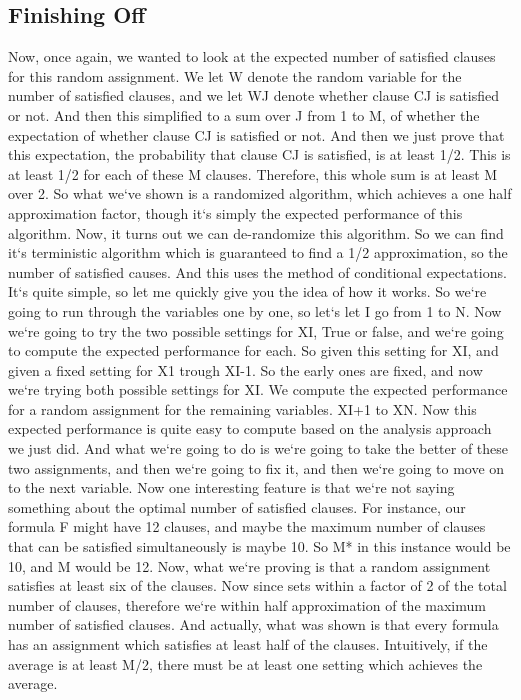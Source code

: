 \subsection{Finishing Off}
Now, once again, we wanted to look at the expected number of satisfied clauses for this random assignment.
We let W denote the random variable for the number of satisfied clauses, and we let WJ denote whether clause CJ is satisfied or not.
And then this simplified to a sum over J from 1 to M, of whether the expectation of whether clause CJ is satisfied or not.
And then we just prove that this expectation, the probability that clause CJ is satisfied, is at least 1/2.
This is at least 1/2 for each of these M clauses.
Therefore, this whole sum is at least M over 2.
So what we`ve shown is a randomized algorithm, which achieves a one half approximation factor, though it`s simply the expected performance of this algorithm.
Now, it turns out we can de-randomize this algorithm.
So we can find it`s terministic algorithm which is guaranteed to find a 1/2 approximation, so the number of satisfied causes.
And this uses the method of conditional expectations.
It`s quite simple, so let me quickly give you the idea of how it works.
So we`re going to run through the variables one by one, so let`s let I go from 1 to N\@.
Now we`re going to try the two possible settings for XI, True or false, and we`re going to compute the expected performance for each.
So given this setting for XI, and given a fixed setting for X1 trough XI-1.
So the early ones are fixed, and now we`re trying both possible settings for XI\@.
We compute the expected performance for a random assignment for the remaining variables.
XI+1 to XN\@.
Now this expected performance is quite easy to compute based on the analysis approach we just did.
And what we`re going to do is we`re going to take the better of these two assignments, and then we`re going to fix it, and then we`re going to move on to the next variable.
Now one interesting feature is that we`re not saying something about the optimal number of satisfied clauses.
For instance, our formula F might have 12 clauses, and maybe the maximum number of clauses that can be satisfied simultaneously is maybe 10.
So M* in this instance would be 10, and M would be 12.
Now, what we`re proving is that a random assignment satisfies at least six of the clauses.
Now since sets within a factor of 2 of the total number of clauses, therefore we`re within half approximation of the maximum number of satisfied clauses.
And actually, what was shown is that every formula has an assignment which satisfies at least half of the clauses.
Intuitively, if the average is at least M/2, there must be at least one setting which achieves the average.

